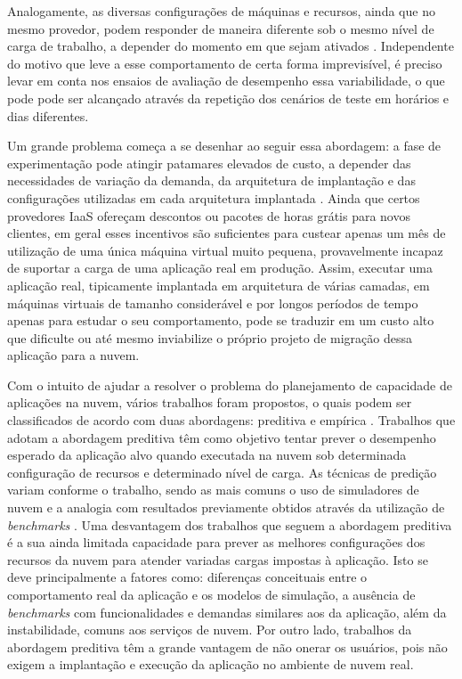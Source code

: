 Analogamente, as diversas configurações de máquinas e recursos, ainda que no mesmo 
provedor, podem responder de maneira diferente sob o mesmo nível de carga de 
trabalho, a depender do momento em que sejam ativados \cite{cunha2011investigating, 
iosup2011performance, jayasinghe2011variations}. Independente do motivo que leve 
a esse comportamento de certa forma imprevisível, é preciso levar em conta nos 
ensaios de avaliação de desempenho essa variabilidade, o que pode pode ser alcançado 
através da repetição dos cenários de teste em horários e dias diferentes.

Um grande problema começa a se desenhar ao seguir essa abordagem: a fase de
experimentação pode atingir patamares elevados de custo, a depender das
necessidades de variação da demanda, da arquitetura de implantação e das 
configurações utilizadas em cada arquitetura implantada \cite{silva2013cloudbench}. 
Ainda que certos provedores IaaS ofereçam descontos ou pacotes de horas grátis 
para novos clientes, em geral esses incentivos são suficientes para custear apenas 
um mês de utilização de uma única máquina virtual muito pequena, provavelmente 
incapaz de suportar a carga de uma aplicação real em produção. Assim, executar 
uma aplicação real, tipicamente implantada em arquitetura de várias camadas, em 
máquinas virtuais de tamanho considerável e por longos períodos de tempo apenas 
para estudar o seu comportamento, pode se traduzir em um custo alto que dificulte ou até mesmo inviabilize 
o próprio projeto de migração dessa aplicação para a nuvem. 

Com o intuito de ajudar a resolver o problema do planejamento de capacidade de aplicações na nuvem, vários trabalhos foram propostos, o quais podem ser classificados de acordo com duas abordagens: preditiva \cite{cloudharmony,
malkowski2010cloudxplor, fittkau2012cdosim, li2011cloudprophet} e empírica 
\cite{jayasinghe2012, silva2013cloudbench, cunhacloud, scheuner2014cloud}.
Trabalhos que adotam a abordagem preditiva têm como objetivo tentar prever o desempenho esperado da aplicação alvo quando executada na nuvem sob determinada configuração de recursos e determinado nível de carga. As técnicas de predição variam conforme o trabalho, sendo as mais comuns o uso de simuladores de nuvem \cite{fittkau2012cdosim} e a analogia com resultados previamente obtidos através da utilização de \emph{benchmarks} \cite{cloudharmony,
malkowski2010cloudxplor}. Uma desvantagem dos trabalhos que seguem a abordagem preditiva é a sua ainda limitada capacidade para prever as melhores configurações dos recursos da nuvem para atender variadas cargas impostas à 
aplicação. Isto se deve principalmente a fatores como: diferenças conceituais entre o comportamento real da aplicação e  
os modelos de simulação, a ausência de \emph{benchmarks} com funcionalidades e demandas similares aos da aplicação, além da instabilidade, comuns aos serviços de nuvem. Por outro lado, trabalhos da abordagem preditiva têm a grande vantagem de não onerar os usuários, pois não exigem a implantação e execução da aplicação no ambiente de nuvem real.


